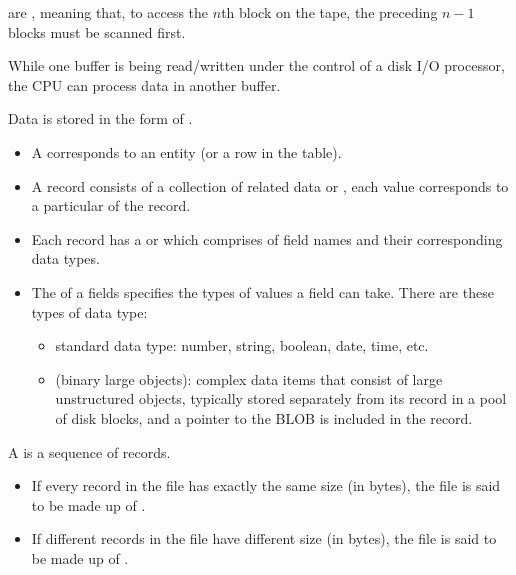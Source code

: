     \par {} are , meaning that, to access the $n$th block on the tape, the preceding $n - 1$ blocks must be scanned first.

  \par While one buffer is being read/written under the control of a disk I/O processor, the CPU can process data in another buffer.

    \par Data is stored in the form of .
    \begin{itemize}
      \item A  corresponds to an entity (or a row in the table).
      \item A record consists of a collection of related data  or , each value corresponds to a particular  of the record.
      \item Each record has a  or  which comprises of field names and their corresponding data types.
      \item The  of a fields specifies the types of values a field can take. There are these types of data type:
      \begin{itemize}
        \item standard data type: number, string, boolean, date, time, etc.
        \item {} (binary large objects): complex data items that consist of large unstructured objects, typically stored separately from its record in a pool of disk blocks, and a pointer to the BLOB is included in the record.
      \end{itemize}
    \end{itemize}

  \par A  is a sequence of records.
  \begin{itemize}
    \item If every record in the file has exactly the same size (in bytes), the file is said to be made up of .
    \item If different records in the file have different size (in bytes), the file is said to be made up of .
  \end{itemize}

